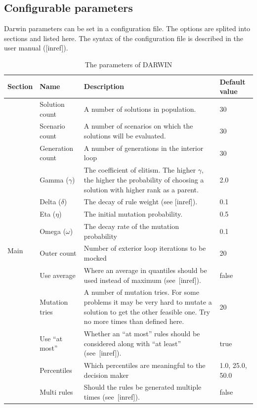 \subsection{Configurable parameters}

Darwin parameters can be set in a configuration file. The options are splited
into sections and listed here. The syntax of the configuration file is
described in the user manual ([inref]).

\begin{table}
  \centering
  \caption{The parameters of DARWIN}
  \label{t:params}

\begin{tabular}{l l p{7cm} l}
    \hline
   Section &  Name & Description & Default value \\
    \hline
    \hline
    \multirow{15}{*}{Main} & 
    Solution count & A number of solutions in population. & 30 \\
    & Scenario count & A number of scenarios on which the solutions will be evaluated.  & 30 \\
    & Generation count & A number of generations in the interior loop & 30 \\
    & Gamma ($\gamma$) & The coefficient of elitism. The higher $\gamma$, the
      higher the probability of choosing a solution with higher rank as a
      parent. & 2.0  \\
    & Delta ($\delta$) & The decay of rule weight (see [inref]). & 0.1  \\
    & Eta ($\eta$) & The initial mutation probability.  & 0.5    \\
    & Omega ($\omega$)& The decay rate of the mutation probability & 0.1  \\
    & Outer count & Number of exterior loop iterations to be mocked & 20 \\
    & Use average & Where an average in quantiles should be used instead of maximum (see~[inref]). & false  \\
    & Mutation tries & A number of mutation tries. For some problems it may be
      very hard to mutate a solution to get the other feasible one. Try no more
      times than defined here.  & 20  \\
    & Use ``at most'' & Whether an ``at most'' rules should be considered
    along with ``at least'' (see~[inref]). & true \\
    & Percentiles & Which percentiles are meaningful to the decision maker & 1.0, 25.0, 50.0  \\
    & Multi rules & Should the rules be generated multiple times (see~[inref]). & false \\

\end{tabular}
\end{table}
